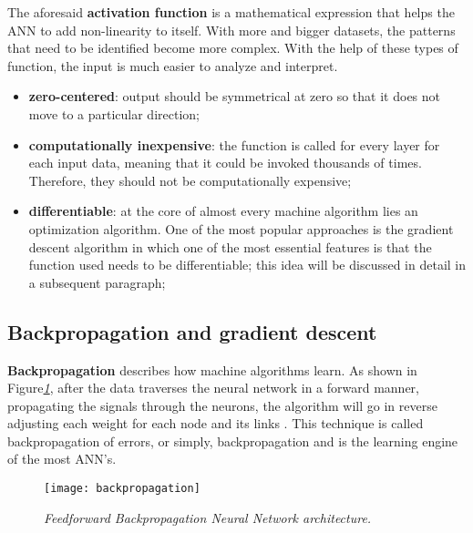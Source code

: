 The aforesaid \textbf{activation function} is a mathematical expression that helps
the ANN to add non-linearity to itself. With more and bigger datasets,
the patterns that need to be identified become more complex.
With the help of these types of function, the input is much easier to analyze and interpret.

\begin{itemize}
    \item{
          \textbf{zero-centered}: output should be symmetrical
          at zero so that it does not move to a particular direction;
          }
    \item{
          \textbf{computationally inexpensive}: the function is called for every layer
          for each input data, meaning that it could be invoked thousands of times.
          Therefore, they should not be computationally expensive;
          }
    \item{
          \textbf{differentiable}: at the core of almost every machine algorithm lies
          an optimization algorithm. One of the most popular
          approaches is the gradient descent algorithm in which one of the most essential
          features is that the function used needs to be differentiable;
          this idea will be discussed in detail in a subsequent paragraph;
          }
\end{itemize}



\subsection{Backpropagation and gradient descent}

\textbf{Backpropagation} describes how machine algorithms learn.
As shown in Figure\emph{\ref{fig:backpropagation}},
after the data traverses the neural network in a forward manner,
propagating the signals through the neurons,
the algorithm will go in reverse adjusting each weight for each node and its links \cite{Goodfellow-et-al-2016}.
This technique is called backpropagation of errors, or simply,
backpropagation and is the learning engine of the most ANN's.

\begin{figure}[h]
    \centering
    \texttt{[image: backpropagation]}
    \caption{\emph{Feedforward Backpropagation Neural Network architecture. \cite{backpropagation}}}
    \label{fig:backpropagation}
\end{figure}

